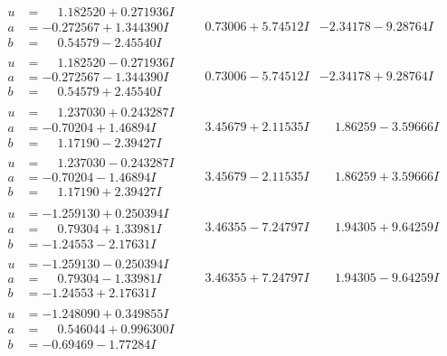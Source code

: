 \documentclass[1p]{elsarticle_modified}
\theoremstyle{definition}
\begin{document}
$$\begin{array}{c|c|c}
\begin{aligned}
u &= \phantom{-}1.182520 + 0.271936 I \\
a &= -0.272567 + 1.344390 I \\
b &= \phantom{-}0.54579 - 2.45540 I\end{aligned}
 & \phantom{-}0.73006 + 5.74512 I & -2.34178 - 9.28764 I \\ \hline\begin{aligned}
u &= \phantom{-}1.182520 - 0.271936 I \\
a &= -0.272567 - 1.344390 I \\
b &= \phantom{-}0.54579 + 2.45540 I\end{aligned}
 & \phantom{-}0.73006 - 5.74512 I & -2.34178 + 9.28764 I \\ \hline\begin{aligned}
u &= \phantom{-}1.237030 + 0.243287 I \\
a &= -0.70204 + 1.46894 I \\
b &= \phantom{-}1.17190 - 2.39427 I\end{aligned}
 & \phantom{-}3.45679 + 2.11535 I & \phantom{-}1.86259 - 3.59666 I \\ \hline\begin{aligned}
u &= \phantom{-}1.237030 - 0.243287 I \\
a &= -0.70204 - 1.46894 I \\
b &= \phantom{-}1.17190 + 2.39427 I\end{aligned}
 & \phantom{-}3.45679 - 2.11535 I & \phantom{-}1.86259 + 3.59666 I \\ \hline\begin{aligned}
u &= -1.259130 + 0.250394 I \\
a &= \phantom{-}0.79304 + 1.33981 I \\
b &= -1.24553 - 2.17631 I\end{aligned}
 & \phantom{-}3.46355 - 7.24797 I & \phantom{-}1.94305 + 9.64259 I \\ \hline\begin{aligned}
u &= -1.259130 - 0.250394 I \\
a &= \phantom{-}0.79304 - 1.33981 I \\
b &= -1.24553 + 2.17631 I\end{aligned}
 & \phantom{-}3.46355 + 7.24797 I & \phantom{-}1.94305 - 9.64259 I \\ \hline\begin{aligned}
u &= -1.248090 + 0.349855 I \\
a &= \phantom{-}0.546044 + 0.996300 I \\
b &= -0.69469 - 1.77284 I\end{aligned}

\end{array}$$
\end{document}

